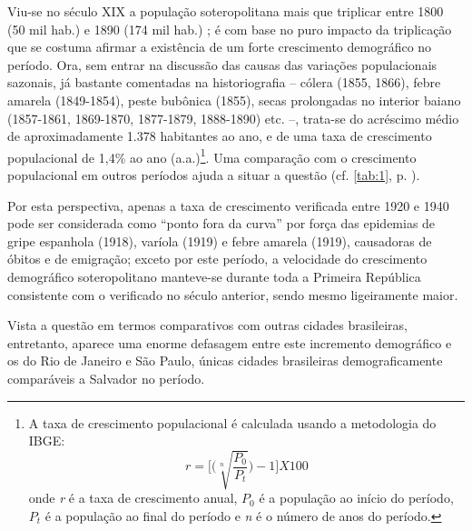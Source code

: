 Viu-se no século XIX a população soteropolitana mais que triplicar entre 1800 (50 mil hab.) e 1890 (174 mil hab.) \cite[p.~70]{sampaio_formas_1999}; é com base no puro impacto da triplicação que se costuma afirmar a existência de um forte crescimento demográfico no período. Ora, sem entrar na discussão das causas das variações populacionais sazonais, já bastante comentadas na historiografia -- cólera (1855, 1866), febre amarela (1849-1854), peste bubônica (1855), secas prolongadas no interior baiano (1857-1861, 1869-1870, 1877-1879, 1888-1890) etc. --, trata-se do acréscimo médio de aproximadamente 1.378 habitantes ao ano, e de uma taxa de crescimento populacional de 1,4\% ao ano (a.a.)\footnote{A taxa de crescimento populacional é calculada usando a metodologia do IBGE: \[ r = \Bigg[ \Bigg( \sqrt[n]{\frac{P_{0}}{P_{t}}} \Bigg) - 1 \Bigg] X 100 \] onde \textit{r} é a taxa de crescimento anual, \textit{$P_{0}$} é a população ao início do período, \textit{$P_{t}$} é a população ao final do período e \textit{n} é o número de anos do período.}. Uma comparação com o crescimento populacional em outros períodos ajuda a situar a questão (cf. \autoref{tab:1}, p. \pageref{tab:1}).



Por esta perspectiva, apenas a taxa de crescimento verificada entre 1920 e 1940 pode ser considerada como ``ponto fora da curva'' por força das epidemias de gripe espanhola (1918), varíola (1919) e febre amarela (1919), causadoras de óbitos e de emigração; exceto por este período, a velocidade do crescimento demográfico soteropolitano manteve-se durante toda a Primeira República consistente com o verificado no século anterior, sendo mesmo ligeiramente maior.

Vista a questão em termos comparativos com outras cidades brasileiras, entretanto, aparece uma enorme defasagem entre este incremento demográfico e os do Rio de Janeiro e São Paulo, únicas cidades brasileiras demograficamente comparáveis a Salvador no período.



